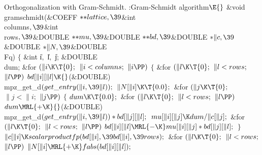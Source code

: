 Orthogonalization with Gram-Schmidt.
\Y\B\4:Gram-Schmidt algorithm\X${}\E{}$\6
\&{void} \\{gramschmidt}(\&{COEFF} ${}{*}{*}\\{lattice},\39{}$\&{int} %
\\{columns}${},\39{}$\&{int} \\{rows}${},\39{}$\&{DOUBLE} ${}{*}{*}\\{mu},%
\39{}$\&{DOUBLE} ${}{*}{*}\\{bd},\39{}$\&{DOUBLE} ${}{*}\|c,\39{}$\&{DOUBLE}
${}{*}\|N,\39{}$\&{DOUBLE} \\{Fq})\1\1\2\2\6
${}\{{}$\1\6
\&{int} \|i${},{}$ \|l${},{}$ \|j;\6
\&{DOUBLE} \\{dum};\7
\&{for} ${}(\|i\K\T{0};{}$ ${}\|i<\\{columns};{}$ ${}\|i\PP){}$\5
${}\{{}$\1\6
\&{for} ${}(\|l\K\T{0};{}$ ${}\|l<\\{rows};{}$ ${}\|l\PP){}$\1\5
${}\\{bd}[\|i][\|l]\K{}$(\&{DOUBLE}) \\{mpz\_get\_d}${}(\\{get\_entry}(\|i,\39%
\|l));{}$\2\6
${}\|N[\|i]\K\T{0.0};{}$\6
\&{for} ${}(\|j\K\T{0};{}$ ${}\|j<\|i;{}$ ${}\|j\PP){}$\5
${}\{{}$\1\6
${}\\{dum}\K\T{0.0};{}$\6
\&{for} ${}(\|l\K\T{0};{}$ ${}\|l<\\{rows};{}$ ${}\|l\PP){}$\1\5
${}\\{dum}\MRL{+{\K}}{}$(\&{DOUBLE}) \\{mpz\_get\_d}${}(\\{get\_entry}(\|i,\39%
\|l))*\\{bd}[\|j][\|l];{}$\2\6
${}\\{mu}[\|i][\|j]\K\\{dum}/\|c[\|j];{}$\6
\&{for} ${}(\|l\K\T{0};{}$ ${}\|l<\\{rows};{}$ ${}\|l\PP){}$\1\5
${}\\{bd}[\|i][\|l]\MRL{-{\K}}\\{mu}[\|i][\|j]*\\{bd}[\|j][\|l];{}$\2\6
\4${}\}{}$\2\6
${}\|c[\|i]\K\\{scalarproductfp}(\\{bd}[\|i],\39\\{bd}[\|i],\39\\{rows});{}$\6
\&{for} ${}(\|l\K\T{0};{}$ ${}\|l<\\{rows};{}$ ${}\|l\PP){}$\1\5
${}\|N[\|i]\MRL{+{\K}}\\{fabs}(\\{bd}[\|i][\|l]);{}$\2\6
